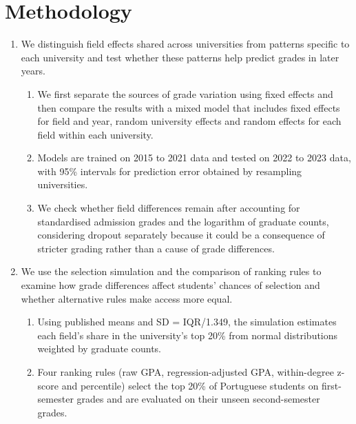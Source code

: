 \documentclass[clean]{bam-outline}
\begin{document}
\section{Methodology}
\begin{enumerate}[resume]
\item We distinguish field effects shared across universities from patterns specific to each university and test whether these patterns help predict grades in later years.
  \begin{enumerate}
  \item We first separate the sources of grade variation using fixed effects and then compare the results with a mixed model that includes fixed effects for field and year, random university effects and random effects for each field within each university.
  \item Models are trained on 2015 to 2021 data and tested on 2022 to 2023 data, with 95\% intervals for prediction error obtained by resampling universities.
  \item We check whether field differences remain after accounting for standardised admission grades and the logarithm of graduate counts, considering dropout separately because it could be a consequence of stricter grading rather than a cause of grade differences.
  \end{enumerate}
\item We use the selection simulation and the comparison of ranking rules to examine how grade differences affect students' chances of selection and whether alternative rules make access more equal.
  \begin{enumerate}
  \item Using published means and SD = IQR/1.349, the simulation estimates each field's share in the university's top 20\% from normal distributions weighted by graduate counts.
  \item Four ranking rules (raw GPA, regression-adjusted GPA, within-degree z-score and percentile) select the top 20\% of Portuguese students on first-semester grades and are evaluated on their unseen second-semester grades.
  \end{enumerate}
\end{enumerate}

\end{document}
